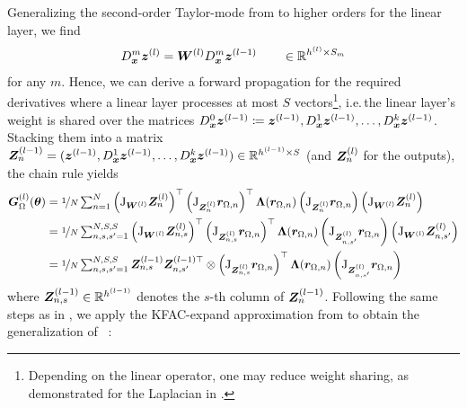 Generalizing the second-order Taylor-mode from  to higher orders for the linear layer, we find
\begin{align}
  D_{\bm{x}}^m {\bm{z}}^{(l)} = {\bm{W}}^{(l)}D_{\bm{x}}^m {\bm{z}}^{(l-1)}
  \qquad \in {\mathbb{R}}^{h^{(l)} \times S_{m}}
\end{align}
for any $m$.
Hence, we can derive a forward propagation for the required derivatives where a linear layer processes at most $S$ vectors\footnote{Depending on the linear operator, one may reduce weight sharing, as demonstrated for the Laplacian in .}, i.e.\,the linear layer's weight is shared over the matrices $D^{0}_{\bm{x}} {\bm{z}}^{(l-1)} \coloneqq {\bm{z}}^{(l-1)}, D_{\bm{x}}^1 {\bm{z}}^{(l-1)}, \dots, D_{\bm{x}}^k {\bm{z}}^{(l-1)}$. Stacking them into a matrix ${\bm{Z}}^{(l-1)}_n = ({\bm{z}}^{(l-1)}, D_{\bm{x}}^1 {\bm{z}}^{(l-1)}, \dots, D_{\bm{x}}^k {\bm{z}}^{(l-1)} ) \in {\mathbb{R}}^{h^{(l-1)} \times S}$ (and ${\bm{Z}}^{(l)}_n$ for the outputs), the chain rule yields
\begin{align*}
  \begin{split}
    {\bm{G}}^{(l)}_{\Omega}({\bm{\theta}})
    &=
      \nicefrac{1}{N}
      \textstyle
      \sum_{n=1}^N
      \left(\mathrm{J}_{{\bm{W}}^{(l)}} {\bm{Z}}^{(l)}_n \right)^{\top}
      \left(
      \mathrm{J}_{{\bm{Z}}^{(l)}_n} {\bm{r}}_{\Omega,n}
      \right)^{\top}
      {\bm{\Lambda}}({\bm{r}}_{\Omega,n})
      \left(
      \mathrm{J}_{{\bm{Z}}^{(l)}_n} {\bm{r}}_{\Omega,n}
      \right)
      \left(\mathrm{J}_{{\bm{W}}^{(l)}} {\bm{Z}}^{(l)}_n \right)
    \\
    &=
      \nicefrac{1}{N}
      \textstyle
      \sum_{n,s,s'=1}^{N,S,S}
      \left(\mathrm{J}_{{\bm{W}}^{(l)}} {\bm{Z}}^{(l)}_{n,s} \right)^{\top}
      \left(
      \mathrm{J}_{{\bm{Z}}^{(l)}_{n,s}} {\bm{r}}_{\Omega,n}
      \right)^{\top}
      {\bm{\Lambda}}({\bm{r}}_{\Omega,n})
      \left(
      \mathrm{J}_{{\bm{Z}}^{(l)}_{n,s'}} {\bm{r}}_{\Omega,n}
      \right)
      \left(\mathrm{J}_{{\bm{W}}^{(l)}} {\bm{Z}}^{(l)}_{n,s'} \right)
    \\
    &=
      \nicefrac{1}{N}
      \textstyle
      \sum_{n,s,s'=1}^{N,S,S}
      {\bm{Z}}^{(l-1)}_{n,s}
      {\bm{Z}}^{(l-1)\top}_{n,s'}
      \otimes
      \left(\mathrm{J}_{{\bm{Z}}^{(l)}_{n,s}} {\bm{r}}_{\Omega,n} \right)^{\top}
      {\bm{\Lambda}}({\bm{r}}_{\Omega,n})
      \left(
      \mathrm{J}_{{\bm{Z}}^{(l)}_{n,s'}} {\bm{r}}_{\Omega,n}
      \right)
  \end{split}
\end{align*}
where ${\bm{Z}}_{n,s}^{(l-1)} \in {\mathbb{R}}^{h^{(l-1)}}$ denotes the $s$-th column of ${\bm{Z}}_n^{(l-1)}$.
Following the same steps as in , we apply the KFAC-expand approximation from \cite{eschenhagen2023kroneckerfactored} to obtain the generalization of ~:
